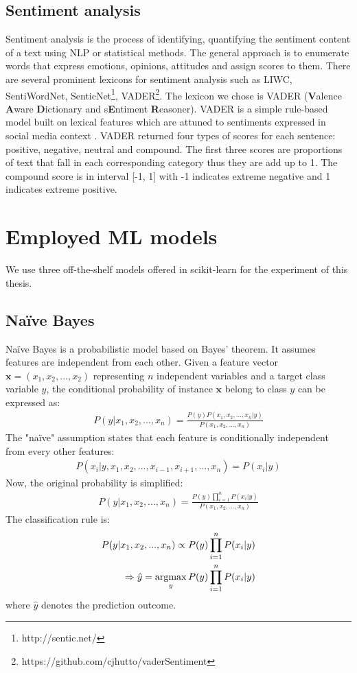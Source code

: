 \subsection*{Sentiment analysis}
Sentiment analysis is the process of identifying, quantifying the sentiment content of a text using NLP or statistical methods. The general approach is to enumerate words that express emotions, opinions, attitudes and assign scores to them. There are several prominent lexicons for sentiment analysis such as LIWC, SentiWordNet, SenticNet\footnote{http://sentic.net/}, VADER\footnote{https://github.com/cjhutto/vaderSentiment}. The lexicon we chose is VADER (\textbf{V}alence \textbf{A}ware \textbf{D}ictionary and s\textbf{E}ntiment \textbf{R}easoner). VADER is a simple rule-based model built on lexical features which are attuned to sentiments expressed in social media context \cite{Hutto2014}. VADER returned four types of scores for each sentence: positive, negative, neutral and compound. The first three scores are proportions of text that fall in each corresponding category thus they are add up to 1. The compound score is in interval [-1, 1] with -1 indicates extreme negative and 1 indicates extreme positive.\\

\section{Employed ML models}
We use three off-the-shelf models offered in scikit-learn for the experiment of this thesis.
\subsection{Na\"ive Bayes}
Na\"ive Bayes is a probabilistic model based on Bayes' theorem. It assumes features are independent from each other. Given a feature vector $\textbf{x} = (x_1, x_2,..., x_2)$ representing $n$ independent variables and a target class variable $y$, the conditional probability of instance $\textbf{x}$ belong to class $y$ can be expressed as:
\begin{eqnarray*}
P(y | x_1, x_2,..., x_n) = \frac{P(y)P( x_1, x_2,..., x_n | y)}{P( x_1, x_2,..., x_n)}
\end{eqnarray*} 
The "na\"ive" assumption states that each feature is conditionally independent from every other features: 
\begin{eqnarray*}
P(x_i | y, x_1, x_2,..., x_{i-1}, x_{i+1},...,x_n) = P(x_i | y)
\end{eqnarray*} 
Now, the original probability is simplified:
\begin{eqnarray*}
P(y | x_1, x_2,..., x_n) = \frac{P(y)\prod\limits_{i=1}^n P( x_i| y)}{P( x_1, x_2,..., x_n)}
\end{eqnarray*} 
The classification rule is:
\begin{eqnarray*}
P(y | x_1, x_2,..., x_n) \propto P(y) \prod\limits_{i=1}^n P( x_i| y)\\
\Rightarrow\hat{y} = \operatorname*{argmax}_y P(y)  \prod\limits_{i=1}^n P( x_i| y)
\end{eqnarray*}
where $\hat{y}$ denotes the prediction outcome.

